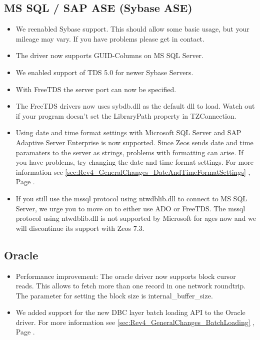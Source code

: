\documentclass[a4paper,12pt,oneside]{book}
\begin{document}
\subsection{MS SQL / SAP ASE (Sybase ASE)}
\label{sec:Rev4_DriverSpecificChanges_MssqlAse}
\begin{itemize}
\item 
  We reenabled Sybase support.
	This should allow some basic usage, but your mileage may vary.
	If you have problems please get in contact.
\item 
  The driver now supports GUID-Columns on MS SQL Server.
\item 
  We enabled support of TDS 5.0 for newer Sybase Servers.
\item 
  With FreeTDS the server port can now be specified.
\item 
  The FreeTDS drivers now uses sybdb.dll as the default dll to load.
	Watch out if your program doesn't set the LibraryPath property in TZConnection.
\item
  Using date and time format settings with Microsoft SQL Server and SAP Adaptive Server Enterprise is now supported.
  Since Zeos sends date and time paramaters to the server as strings, problems with formatting can arise.
	If you have problems, try changing the date and time format settings.
	For more information see \ref{sec:Rev4_GeneralChanges_DateAndTimeFormatSettings} , Page \pageref{sec:Rev4_GeneralChanges_DateAndTimeFormatSettings}.
\item 
  If you still use the mssql protocol using ntwdblib.dll to connect to MS SQL Server, we urge you to move on to either use ADO or FreeTDS.
	The mssql protocol using ntwdblib.dll is not supported by Microsoft for ages now and we will discontinue its support with Zeos 7.3.
\end{itemize}

\subsection{Oracle}
\label{sec:Rev4_DriverSpecificChanges_Oracle}
\begin{itemize}
\item
  Performance improvement: The oracle driver now supports block cursor reads.
	This allows to fetch more than one record in one network roundtrip.
	The parameter for setting the block size is internal\_buffer\_size.
\item
  We added support for the new DBC layer batch loading API to the Oracle driver.
	For more information see \ref{sec:Rev4_GeneralChanges_BatchLoading} , Page \pageref{sec:Rev4_GeneralChanges_BatchLoading}.
\end{itemize}
\end{document}
